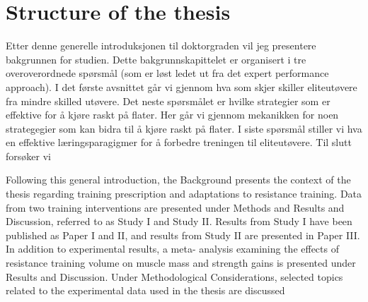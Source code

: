 \section{Structure of the thesis}
Etter denne generelle introduksjonen til doktorgraden vil jeg presentere bakgrunnen for studien. Dette bakgrunnskapittelet er organisert i tre overoverordnede spørsmål (som er løst ledet ut fra det expert performance approach). I det første avsnittet går vi gjennom hva som skjer skiller eliteutøvere fra mindre skilled utøvere. Det neste spørsmålet er hvilke strategier som er effektive for å kjøre raskt på flater. Her går vi gjennom mekanikken for noen strategegier som kan bidra til å kjøre raskt på flater. I siste spørsmål stiller vi hva en effektive læringsparagigmer for å forbedre treningen til eliteutøvere. Til slutt forsøker vi 


Following this general introduction, the Background presents the context of the thesis
regarding training prescription and adaptations to resistance training. Data from two
training interventions are presented under Methods and Results and Discussion, referred to
as Study I and Study II. Results from Study I have been published as Paper I and II, and
results from Study II are presented in Paper III. In addition to experimental results, a meta-
analysis examining the effects of resistance training volume on muscle mass and strength
gains is presented under Results and Discussion. Under Methodological Considerations,
selected topics related to the experimental data used in the thesis are discussed
